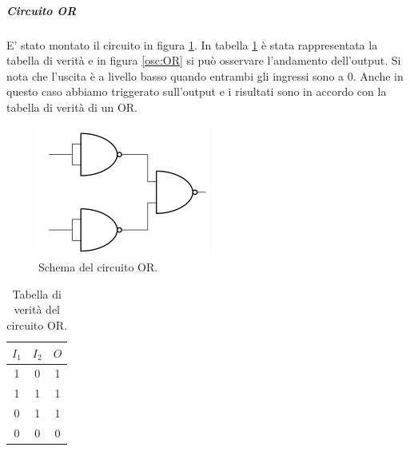 \documentclass[10pt,a4paper]{article}
\begin{document}
\subparagraph{Circuito OR}

E' stato montato il circuito in figura \ref{fig:OR}. In tabella \ref{tab:OR} è stata rappresentata la tabella di verità e in figura \ref{osc:OR} si può osservare l'andamento dell'output. Si nota che l'uscita è a livello basso quando entrambi gli ingressi sono a 0. Anche in questo caso abbiamo triggerato sull'output e i risultati sono in accordo con la tabella di verità di un OR.

\begin{figure}[!htb]
  \centering
  \includegraphics[scale=0.5]{OR.png}
\caption{Schema del circuito OR.\label{fig:OR}}
\end{figure}

\begin{table}[!htb]
\begin{tabular}{|c|c|c|}
\hline 
$I_1$ & $I_2$ & $O$ \\
\hline
 1 &  0 & 1\\ 

 1 &  1 & 1\\ 
 
 0 &  1 & 1\\ 
 
 0 &  0 & 0\\ 
\hline 
\end{tabular} 
\caption{Tabella di verità del circuito OR.\label{tab:OR}}
\end{table}
\end{document}
